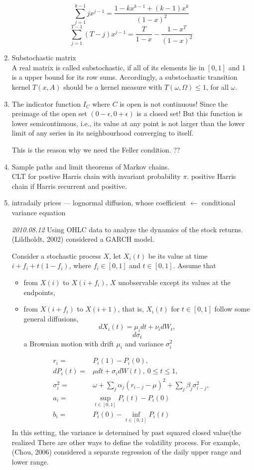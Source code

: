 \documentclass[11pt,a4paper]{article}
\begin{document}
\begin{enumerate}
 $$ \sum_{j=1}^{k-1}jx^{j-1}=\frac{1-kx^{k-1}+(k-1)x^k}{(1-x)^2} $$
  $$ \sum_{j=1}^{T-1}(T-j)x^{j-1}=\frac{T}{1-x}-\frac{1-x^T}{(1-x)^2} $$

\item Substochastic matrix\\
A real matrix is called substochastic, if all of its elements lie in $ [0,1] $ and 1 is a upper bound for its row sums.
Accordingly, a substochastic transition kernel $ T(x,A) $ should be a kernel measure with $ T(\omega,\Omega)\leq 1 $, for all $ \omega $.


\item The indicator function $ I_{C} $ where $ C $ is open is not continuous! Since the preimage of the open set $ (0-\epsilon,0+\epsilon) $ is a closed set! But this function is lower semicontinuous, i.e., its value at any point is not larger than the lower limit of any series in its neighbourhood converging to itself.

This is the reason why we need the Feller condition.
??

\item Sample paths and limit theorems of Markov chains.\\
CLT for postive Harris chain with invariant probability $ \pi $.
positive Harris chain if Harris recurrent and positive.

\item
intradaily prices --- lognormal diffusion, whose coefficient $ \leftarrow $ conditional variance equation

\textit{2010.08.12}
Using OHLC data to analyze the dynamics of the stock returns.
(Lildholdt, 2002) considered a GARCH model.

Consider a stochastic process $ X $, let $ X_i(t) $ be its value at time $ i+f_i+t(1-f_i) $, where $ f_i\in [0,1] $ and $ t\in[0,1] $. Assume that
\begin{itemize}
\item  from $ X(i) $ to $ X(i+f_i) $, $ X $ unobservable except its values at the endpoints,
\item from $ X(i+f_i) $ to $ X(i+1) $, that is, $ X_i(t) $ for $ t\in[0,1] $ follow some general diffusions,
\[ dX_i(t)=\mu_i dt + \nu_i d W_t, \]
\[ d\sigma_t \]a Brownian motion with drift $ \mu_i $ and variance $ \sigma_i^2 $
\end{itemize}
\begin{align*}
r_i=&P_i(1)-P_i(0),\\
dP_i(t)=&\mu dt+\sigma_i dW(t), \ 0\leq t\leq 1,\\
\sigma_i^2=&\omega+\sum_j\alpha_j(r_{i-j}-\mu)^2+\sum_j \beta_j\sigma^2_{i-j},\\
a_i=&\sup_{t\in[0,1]}P_i(t)-P_i(0)\\
b_i=&P_i(0)-\inf_{t\in[0,1]}P_i(t)\\
\end{align*}
In this setting, the variance is determined by past squared closed value(the realized
There are other ways to define the volatility process. For example, (Chou, 2006) considered a separate regression of the daily upper range and lower range. 


\end{enumerate}
\end{document}
